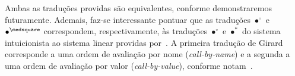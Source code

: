     Ambas as traduções providas são equivalentes, conforme demonstraremos futuramente.
    Ademais, faz-se interessante pontuar que as traduções $\bullet^\circ$ e $\bullet^\medsquare$ correspondem, respectivamente, às traduções $\bullet^\circ$ e $\bullet^*$ do sistema intuicionista ao sistema linear providas por~\cite{Girard}. A primeira tradução de Girard corresponde a uma ordem de avaliação por nome (\textit{call-by-name}) e a segunda a uma ordem de avaliação por valor (\textit{call-by-value}), conforme notam~\cite{Maraist}.

